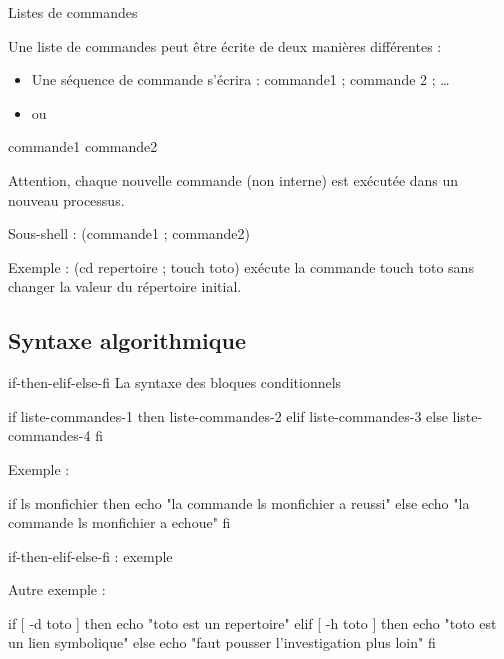 \documentclass[10pt]{beamer}
\begin{document}
\begin{frame}[fragile]{Listes de commandes}

Une liste de commandes peut être écrite de deux manières différentes :
\begin{itemize}
\item Une séquence de commande s’écrira : commande1 ; commande 2 ; \ldots
\item ou
\end{itemize}
\begin{mylisting}
commande1
commande2
\end{mylisting}

\pause 
Attention, chaque nouvelle commande (non interne) est exécutée dans un nouveau processus.

Sous-shell : (commande1 ; commande2)

Exemple : (cd repertoire ; touch toto)
exécute la commande touch toto sans changer la valeur du répertoire initial.

\end{frame}

\subsection{Syntaxe algorithmique}
\begin{frame}[fragile]{if-then-elif-else-fi}
La syntaxe des bloques conditionnels 
\begin{mylisting}
if liste-commandes-1
then liste-commandes-2
elif liste-commandes-3
else liste-commandes-4
fi
\end{mylisting}

\pause
Exemple :
\begin{mylisting}
if ls monfichier
then echo "la commande ls monfichier a reussi"
else echo "la commande ls monfichier a echoue"
fi
\end{mylisting}
\end{frame}

\begin{frame}[fragile]{if-then-elif-else-fi : exemple}

Autre exemple :
\begin{mylisting}
if [ -d toto ]
then echo "toto est un repertoire"
elif [ -h toto ]
then echo "toto est un lien symbolique"
else echo "faut pousser l'investigation plus loin"
fi
\end{mylisting}

\end{frame}
\end{document}
